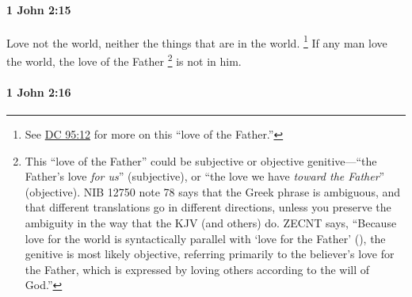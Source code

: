 		\paragraph{1 John 2:15} %
			\label{1JOHN-2-15}

			Love not the world, neither the things that are in the world.
				\footnote{%
					See \hyperref[DC95-12]{DC 95:12} for more on this ``love of the Father.''
					}%
			If any man love the world, the love of the Father%
				\footnote{%
					This ``love of the Father'' could be subjective or objective genitive---``the Father's love \textit{for us}'' (subjective), or ``the love we have \textit{toward the Father}'' (objective). NIB 12750 note 78 says that the Greek phrase is ambiguous, and that different translations go in different directions, unless you preserve the ambiguity in the way that the KJV (and others) do. ZECNT says, ``Because love for the world is syntactically parallel with `love for the Father' (), the genitive is most likely objective, referring primarily to the believer's love for the Father, which is expressed by loving others according to the will of God.''
					}
			is not in him.

			\begin{framed}
			\scriptsize
				\begin{compactdesc}
					\item[SBLG] 
				\end{compactdesc}
			\end{framed}

		\paragraph{1 John 2:16} %
			\label{1JOHN-2-16}

